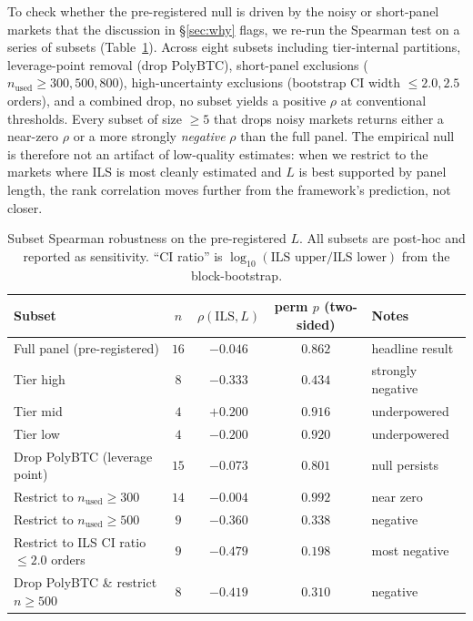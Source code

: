 \documentclass{article}
\begin{document}
To check whether the pre-registered null is driven by the noisy or short-panel markets that the discussion in \S\ref{sec:why} flags, we re-run the Spearman test on a series of subsets (Table~\ref{tab:robustness}). Across eight subsets including tier-internal partitions, leverage-point removal (drop PolyBTC), short-panel exclusions ($n_\text{used} \ge 300, 500, 800$), high-uncertainty exclusions (bootstrap CI width $\le 2.0, 2.5$ orders), and a combined drop, no subset yields a positive $\rho$ at conventional thresholds. Every subset of size $\ge 5$ that drops noisy markets returns either a near-zero $\rho$ or a more strongly \emph{negative} $\rho$ than the full panel. The empirical null is therefore not an artifact of low-quality estimates: when we restrict to the markets where ILS is most cleanly estimated and $L$ is best supported by panel length, the rank correlation moves further from the framework's prediction, not closer.

\begin{table}[h]
\centering
\caption{Subset Spearman robustness on the pre-registered $L$. All subsets are post-hoc and reported as sensitivity. ``CI ratio'' is $\log_{10}(\text{ILS upper}/\text{ILS lower})$ from the block-bootstrap.}
\label{tab:robustness}
\small
\begin{tabular}{lcccl}
\toprule
Subset & $n$ & $\rho(\mathrm{ILS}, L)$ & perm $p$ (two-sided) & Notes \\
\midrule
Full panel (pre-registered)              & $16$ & $-0.046$ & $0.862$ & headline result \\
Tier high                                & $8$  & $-0.333$ & $0.434$ & strongly negative \\
Tier mid                                 & $4$  & $+0.200$ & $0.916$ & underpowered \\
Tier low                                 & $4$  & $-0.200$ & $0.920$ & underpowered \\
Drop PolyBTC (leverage point)            & $15$ & $-0.073$ & $0.801$ & null persists \\
Restrict to $n_\text{used} \ge 300$      & $14$ & $-0.004$ & $0.992$ & near zero \\
Restrict to $n_\text{used} \ge 500$      & $9$  & $-0.360$ & $0.338$ & negative \\
Restrict to ILS CI ratio $\le 2.0$ orders& $9$  & $-0.479$ & $0.198$ & most negative \\
Drop PolyBTC \& restrict $n \ge 500$     & $8$  & $-0.419$ & $0.310$ & negative \\
\bottomrule
\end{tabular}
\end{table}
\end{document}
